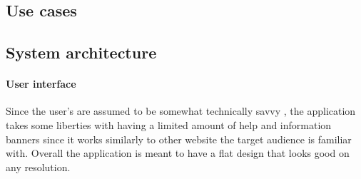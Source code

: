 \documentclass[12pt]{article}
\begin{document}
\subsection{Use cases}
\subsection{System architecture}
\paragraph{User interface}
Since the user's are assumed to be somewhat technically savvy , the application takes some liberties with having a limited amount of help and information banners since it works similarly to other website the target audience is familiar with.
Overall the application is meant to have a flat design that looks good on any resolution.
\end{document}

